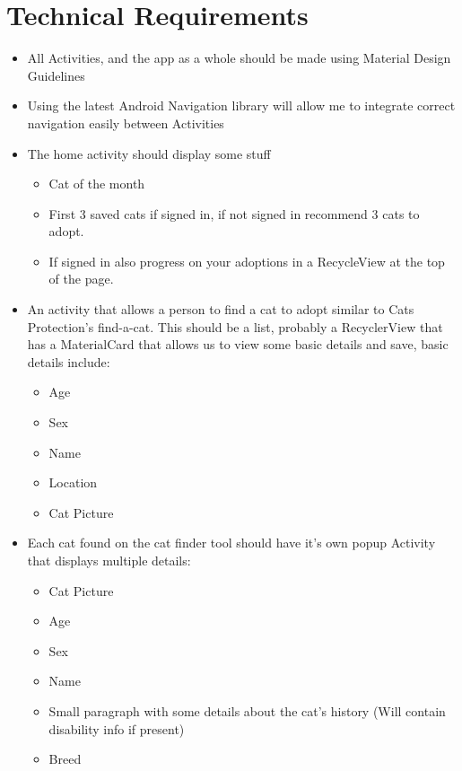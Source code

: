 \chapter{Technical Requirements} \label{TECHREQUIREMENTS}

\begin{itemize}
    \item All Activities, and the app as a whole should be made using Material Design Guidelines
    \item Using the latest Android Navigation library will allow me to integrate correct navigation easily between Activities
    \item The home activity should display some stuff
        \begin{itemize}
            \item Cat of the month
            \item First 3 saved cats if signed in, if not signed in recommend 3 cats to adopt.
            \item If signed in also progress on your adoptions in a RecycleView at the top of the page.
        \end{itemize}
    \item An activity that allows a person to find a cat to adopt similar to Cats Protection's find-a-cat. This should be a list, probably a RecyclerView that has a MaterialCard that allows us to view some basic details and save, basic details include:
        \begin{itemize}
            \item Age
            \item Sex
            \item Name
            \item Location
            \item Cat Picture
        \end{itemize}
    \item Each cat found on the cat finder tool should have it's own popup Activity that displays multiple details:
        \begin{itemize}
            \item Cat Picture
            \item Age
            \item Sex
            \item Name
            \item Small paragraph with some details about the cat's history (Will contain disability info if present)
            \item Breed

\end{itemize}
\end{itemize}

